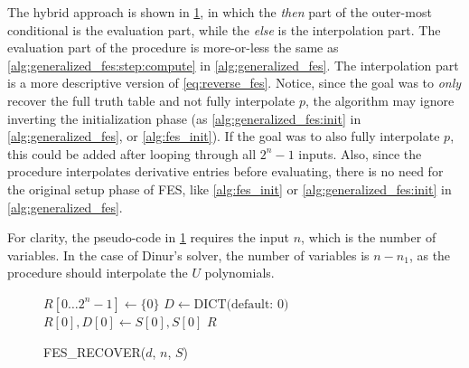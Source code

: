 The hybrid approach is shown in \cref{alg:fes_recover}, in which the \textit{then} part of the outer-most conditional is the evaluation part, while the \textit{else} is the interpolation part. The evaluation part of the procedure is more-or-less the same as \cref{alg:generalized_fes:step:compute} in \cref{alg:generalized_fes}. The interpolation part is a more descriptive version of \cref{eq:reverse_fes}. Notice, since the goal was to \textit{only} recover the full truth table and not fully interpolate $p$, the algorithm may ignore inverting the initialization phase (as \cref{alg:generalized_fes:init} in \cref{alg:generalized_fes}, or \cref{alg:fes_init}). If the goal was to also fully interpolate $p$, this could be added after looping through all $2^n - 1$ inputs. Also, since the procedure interpolates derivative entries before evaluating, there is no need for the original setup phase of FES, like \cref{alg:fes_init} or \cref{alg:generalized_fes:init} in \cref{alg:generalized_fes}. 

For clarity, the pseudo-code in \cref{alg:fes_recover} requires the input $n$, which is the number of variables. In the case of Dinur's solver, the number of variables is $n - n_1$, as the procedure should interpolate the $U$ polynomials.

\begin{figure}[h!t]
    \begin{alg}
        $R[0\dots 2^n - 1] \gets \{0\}$\;
        $D \gets \text{DICT(default: 0)}$\;
        $R[0], D[0] \gets S[0], S[0]$\;
        \Return $R$\;
        \caption{FES\_RECOVER($d$, $n$, $S$)} \label{alg:fes_recover}
    \end{alg}
\end{figure}


\newpage
